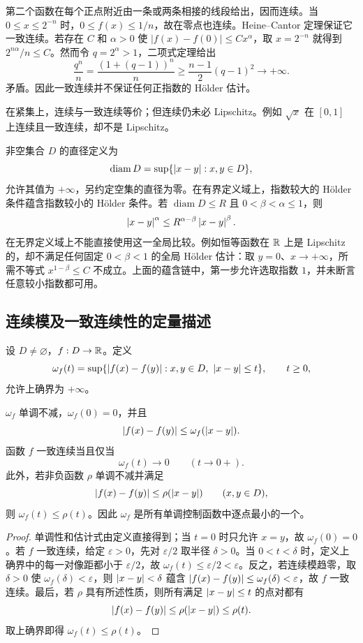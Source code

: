 第二个函数在每个正点附近由一条或两条相接的线段给出，因而连续。当 \(0\le x\le2^{-n}\) 时，\(0\le f(x)\le1/n\)，故在零点也连续。Heine--Cantor 定理保证它一致连续。若存在 \(C\) 和 \(\alpha>0\) 使 \(|f(x)-f(0)|\le Cx^\alpha\)，取 \(x=2^{-n}\) 就得到 \(2^{n\alpha}/n\le C\)。然而令 \(q=2^\alpha>1\)，二项式定理给出
\[
 \frac{q^n}{n}=\frac{(1+(q-1))^n}{n}
 \ge\frac{n-1}{2}(q-1)^2\longrightarrow+\infty.
\]
矛盾。因此一致连续并不保证任何正指数的 Hölder 估计。

在紧集上，连续与一致连续等价；但连续仍未必 Lipschitz。例如 \(\sqrt x\) 在 \([0,1]\) 上连续且一致连续，却不是 Lipschitz。

\begin{remark}
非空集合 \(D\) 的直径定义为
\[
 \operatorname{diam}D=\sup\{\left|x-y\right|:x,y\in D\},
\]
允许其值为 \(+\infty\)，另约定空集的直径为零。在有界定义域上，指数较大的 Hölder 条件蕴含指数较小的 Hölder 条件。若 \(\operatorname{diam}D\le R\) 且 \(0<\beta<\alpha\le1\)，则
\[
 \left|x-y\right|^{\alpha}
 \le R^{\alpha-\beta}\left|x-y\right|^{\beta}.
\]
在无界定义域上不能直接使用这一全局比较。例如恒等函数在 \(\mathbb{R}\) 上是 Lipschitz 的，却不满足任何固定 \(0<\beta<1\) 的全局 Hölder 估计：取 \(y=0\)、\(x\to+\infty\)，所需不等式 \(x^{1-\beta}\le C\) 不成立。上面的蕴含链中，第一步允许选取指数 \(1\)，并未断言任意较小指数都可用。
\end{remark}

\subsection{连续模及一致连续性的定量描述}


\begin{definition}[连续模]
设 \(D\ne\varnothing\)，\(f:D\to\mathbb{R}\)。定义
\[
 \omega_f(t)=
 \sup\{\left|f(x)-f(y)\right|:x,y\in D,\ \left|x-y\right|\le t\},
 \qquad t\ge0,
\]
允许上确界为 \(+\infty\)。
\end{definition}

\begin{proposition}
\(\omega_f\) 单调不减，\(\omega_f(0)=0\)，并且
\[
 \left|f(x)-f(y)\right|\le\omega_f(\left|x-y\right|).
\]
函数 \(f\) 一致连续当且仅当
\[
 \omega_f(t)\longrightarrow0\qquad(t\to0+).
\]
此外，若非负函数 \(\rho\) 单调不减并满足
\[
 \left|f(x)-f(y)\right|\le\rho(\left|x-y\right|)
 \qquad(x,y\in D),
\]
则 \(\omega_f(t)\le\rho(t)\)。因此 \(\omega_f\) 是所有单调控制函数中逐点最小的一个。
\end{proposition}

\begin{proof}
单调性和估计式由定义直接得到；当 \(t=0\) 时只允许 \(x=y\)，故 \(\omega_f(0)=0\)。若 \(f\) 一致连续，给定 \(\varepsilon>0\)，先对 \(\varepsilon/2\) 取半径 \(\delta>0\)。当 \(0<t<\delta\) 时，定义上确界中的每一对像距都小于 \(\varepsilon/2\)，故 \(\omega_f(t)\le\varepsilon/2<\varepsilon\)。反之，若连续模趋零，取 \(\delta>0\) 使 \(\omega_f(\delta)<\varepsilon\)，则 \(\left|x-y\right|<\delta\) 蕴含 \(\left|f(x)-f(y)\right|\le\omega_f(\delta)<\varepsilon\)，故 \(f\) 一致连续。最后，若 \(\rho\) 具有所述性质，则所有满足 \(\left|x-y\right|\le t\) 的点对都有
\[
 \left|f(x)-f(y)\right|\le\rho(\left|x-y\right|)\le\rho(t).
\]
取上确界即得 \(\omega_f(t)\le\rho(t)\)。
\end{proof}

